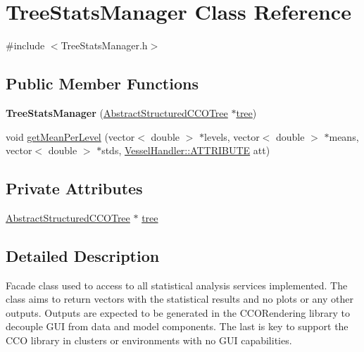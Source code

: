 \hypertarget{class_tree_stats_manager}{}\section{Tree\+Stats\+Manager Class Reference}
\label{class_tree_stats_manager}


{\ttfamily \#include $<$Tree\+Stats\+Manager.\+h$>$}

\subsection*{Public Member Functions}
\begin{DoxyCompactItemize}
\item 
{\bfseries Tree\+Stats\+Manager} (\hyperlink{class_abstract_structured_c_c_o_tree}{Abstract\+Structured\+C\+C\+O\+Tree} $\ast$\hyperlink{class_tree_stats_manager_a87781acaeb7b0eab470e6678c97b9ec5}{tree})\hypertarget{class_tree_stats_manager_a6073419bbbf25c7c9c37d7f7dd47c3fe}{}\label{class_tree_stats_manager_a6073419bbbf25c7c9c37d7f7dd47c3fe}

\item 
void \hyperlink{class_tree_stats_manager_a49a109dfc97178229e77fd1a79343423}{get\+Mean\+Per\+Level} (vector$<$ double $>$ $\ast$levels, vector$<$ double $>$ $\ast$means, vector$<$ double $>$ $\ast$stds, \hyperlink{class_vessel_handler_a6cc775e9a5bcbe69ef381f56b52982e7}{Vessel\+Handler\+::\+A\+T\+T\+R\+I\+B\+U\+TE} att)
\end{DoxyCompactItemize}
\subsection*{Private Attributes}
\begin{DoxyCompactItemize}
\item 
\hyperlink{class_abstract_structured_c_c_o_tree}{Abstract\+Structured\+C\+C\+O\+Tree} $\ast$ \hyperlink{class_tree_stats_manager_a87781acaeb7b0eab470e6678c97b9ec5}{tree}
\end{DoxyCompactItemize}


\subsection{Detailed Description}
Facade class used to access to all statistical analysis services implemented. The class aims to return vectors with the statistical results and no plots or any other outputs. Outputs are expected to be generated in the C\+C\+O\+Rendering library to decouple G\+UI from data and model components. The last is key to support the C\+CO library in clusters or environments with no G\+UI capabilities.

